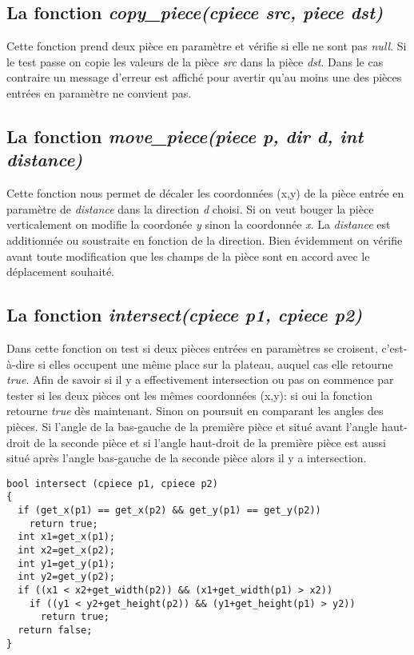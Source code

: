 \documentclass{report}
\begin{document}
\subsection*{La fonction \textit{copy\_piece(cpiece src, piece dst)}}
Cette fonction prend deux pièce en paramètre et vérifie si elle ne sont pas \textit{null}. Si le test passe on copie les valeurs de la pièce \textit{src} dans la pièce \textit{dst}. Dans le cas contraire un message d'erreur est affiché pour avertir qu'au moins une des pièces entrées en paramètre ne convient pas.
\subsection*{La fonction \textit{move\_piece(piece p, dir d, int distance)}}
Cette fonction nous permet de décaler les coordonnées (x,y) de la pièce entrée en paramètre de \textit{distance} dans la direction \textit{d} choisi. Si on veut bouger la pièce verticalement on modifie la coordonée \textit{y} sinon la coordonnée \textit{x}. La \textit{distance} est additionnée ou soustraite en fonction de la direction. Bien évidemment on vérifie avant toute modification que les champs de la pièce sont en accord avec le déplacement souhaité.
\subsection*{La fonction \textit{intersect(cpiece p1, cpiece p2)}}
Dans cette fonction on test si deux pièces entrées en paramètres se croisent, c'est-à-dire si elles occupent une même place sur la plateau, auquel cas elle retourne \textit{true}. Afin de savoir si il y a effectivement intersection ou pas on commence par tester si les deux pièces ont les mêmes coordonnées (x,y): si oui la fonction retourne \textit{true} dès maintenant. Sinon on poursuit en comparant les angles des pièces. Si l'angle de la bas-gauche de la première pièce et situé avant l'angle haut-droit de la seconde pièce et si l'angle haut-droit de la première pièce est aussi situé après l'angle bas-gauche de la seconde pièce alors il y a intersection.
\begin{lstlisting}
bool intersect (cpiece p1, cpiece p2)
{
  if (get_x(p1) == get_x(p2) && get_y(p1) == get_y(p2)) 
    return true;
  int x1=get_x(p1);
  int x2=get_x(p2);
  int y1=get_y(p1);
  int y2=get_y(p2);
  if ((x1 < x2+get_width(p2)) && (x1+get_width(p1) > x2))
    if ((y1 < y2+get_height(p2)) && (y1+get_height(p1) > y2))
      return true;
  return false;
}
\end{lstlisting}
\end{document}
